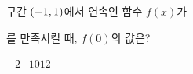 구간 $(-1{,}\mkern3mu\mathopen{}1)$에서 연속인 함수 $f(x)$가 \par\smallskip{}\par\smallskip\noindent 를 만족시킬 때, $f(0)$의 값은?
\begin{choices32}{$-2$}{$-1$}{$0$}{$1$}{$2$}\end{choices32}
